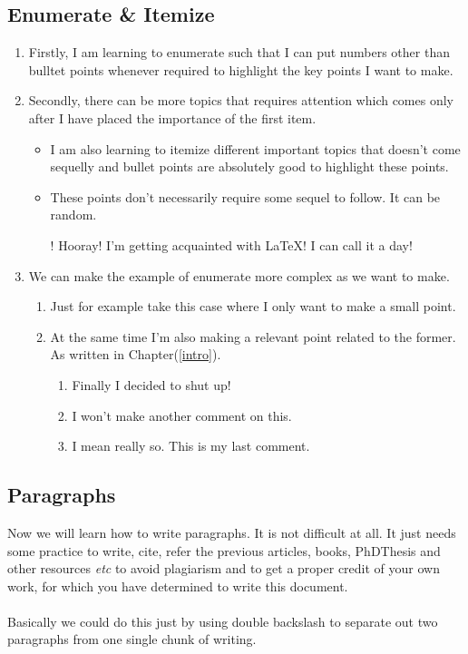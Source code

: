 \documentclass[onecolumn,12pt]{article}
\begin{document}
\subsection{Enumerate \& Itemize}
\begin{enumerate}
\item Firstly, I am learning to enumerate such that I can put numbers other than bulltet points whenever required to highlight the key points I want to make. 
\item Secondly, there can be more topics that requires attention which comes only after I have placed the importance of the first item.

\begin{itemize}
\item I am also learning to itemize different important topics that doesn't come sequelly and bullet points are absolutely good to highlight these points.
\item These points don't necessarily require some sequel to follow. It can be random.
\item[!] Hooray! I'm getting acquainted with LaTeX! I can call it a day!
\end{itemize}

\item We can make the example of enumerate more complex as we want to make.
    \begin{enumerate}
	\item Just for example take this case where I only want to make a small point.
	\item At the same time I'm also making a relevant point related to the former. As written in Chapter(\ref{intro}).
	    \begin{enumerate}
	    \item Finally I decided to shut up!
	    \item I won't make another comment on this.
	    \item I mean really so. This is my last comment.
	    \end{enumerate}
	\end{enumerate}	
\end{enumerate}

\subsection{Paragraphs}
Now we will learn how to write paragraphs. It is not difficult at all. It just needs some practice to write, cite, refer the previous articles\cite{bhmeadd}, books, PhDThesis\cite{bhatam} and other 	resources {\it etc} to avoid plagiarism and to get a proper credit of your own work, for which you have determined to write this document. 
\\ \ \\
Basically we could do this just by using double backslash to separate out two paragraphs from one single chunk of writing. 
\end{document}
